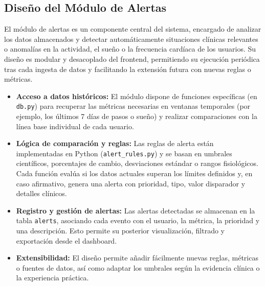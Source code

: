 \subsection{Diseño del Módulo de Alertas}
\label{subsec:diseno_alertas}

El módulo de alertas es un componente central del sistema, encargado de analizar los datos almacenados y detectar automáticamente situaciones clínicas relevantes o anomalías en la actividad, el sueño o la frecuencia cardíaca de los usuarios. Su diseño es modular y desacoplado del frontend, permitiendo su ejecución periódica tras cada ingesta de datos y facilitando la extensión futura con nuevas reglas o métricas.

\begin{itemize}
    \item \textbf{Acceso a datos históricos:} El módulo dispone de funciones específicas (en \texttt{db.py}) para recuperar las métricas necesarias en ventanas temporales (por ejemplo, los últimos 7 días de pasos o sueño) y realizar comparaciones con la línea base individual de cada usuario.
    \item \textbf{Lógica de comparación y reglas:} Las reglas de alerta están implementadas en Python (\texttt{alert\_rules.py}) y se basan en umbrales científicos, porcentajes de cambio, desviaciones estándar o rangos fisiológicos. Cada función evalúa si los datos actuales superan los límites definidos y, en caso afirmativo, genera una alerta con prioridad, tipo, valor disparador y detalles clínicos.
    \item \textbf{Registro y gestión de alertas:} Las alertas detectadas se almacenan en la tabla \texttt{alerts}, asociando cada evento con el usuario, la métrica, la prioridad y una descripción. Esto permite su posterior visualización, filtrado y exportación desde el dashboard.
    \item \textbf{Extensibilidad:} El diseño permite añadir fácilmente nuevas reglas, métricas o fuentes de datos, así como adaptar los umbrales según la evidencia clínica o la experiencia práctica.
\end{itemize}

